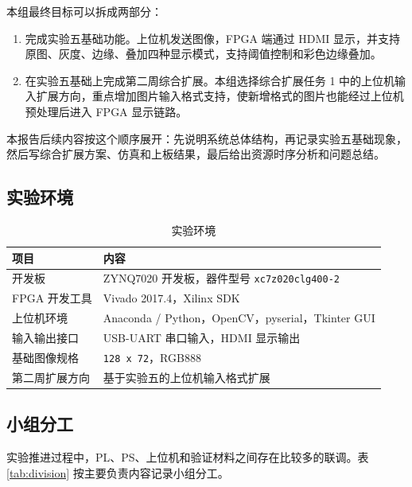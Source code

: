 \documentclass[12pt,a4paper]{ctexart}
\begin{document}
本组最终目标可以拆成两部分：

\begin{enumerate}
    \item 完成实验五基础功能。上位机发送图像，FPGA 端通过 HDMI 显示，并支持原图、灰度、边缘、叠加四种显示模式，支持阈值控制和彩色边缘叠加。
    \item 在实验五基础上完成第二周综合扩展。本组选择综合扩展任务 1 中的上位机输入扩展方向，重点增加图片输入格式支持，使新增格式的图片也能经过上位机预处理后进入 FPGA 显示链路。
\end{enumerate}

本报告后续内容按这个顺序展开：先说明系统总体结构，再记录实验五基础现象，然后写综合扩展方案、仿真和上板结果，最后给出资源时序分析和问题总结。

\subsection{实验环境}

\begin{table}[H]
\centering
\caption{实验环境}
\begin{tabular}{p{}p{}}
\toprule
项目 & 内容 \\
\midrule
开发板 & ZYNQ7020 开发板，器件型号 \verb|xc7z020clg400-2| \\
FPGA 开发工具 & Vivado 2017.4，Xilinx SDK \\
上位机环境 & Anaconda / Python，OpenCV，pyserial，Tkinter GUI \\
输入输出接口 & USB-UART 串口输入，HDMI 显示输出 \\
基础图像规格 & \verb|128 x 72|，RGB888 \\
第二周扩展方向 & 基于实验五的上位机输入格式扩展 \\
\bottomrule
\end{tabular}
\end{table}

\subsection{小组分工}

实验推进过程中，PL、PS、上位机和验证材料之间存在比较多的联调。表 \ref{tab:division} 按主要负责内容记录小组分工。
\end{document}
